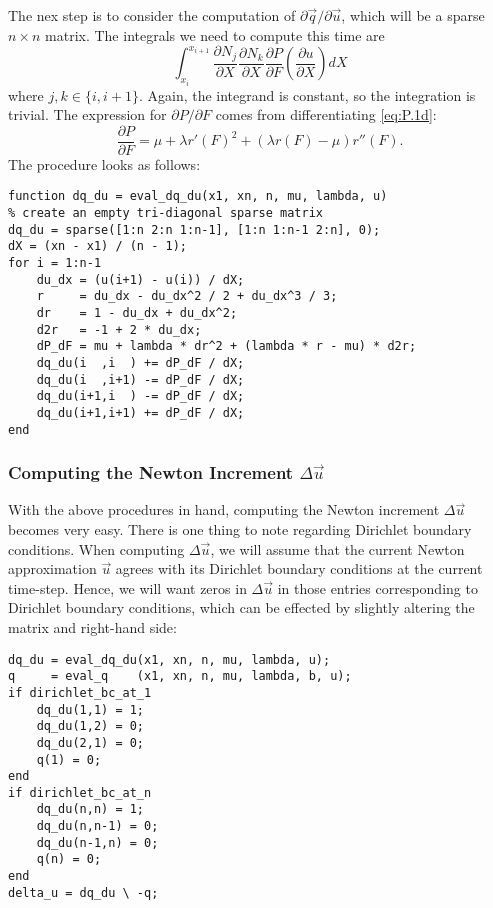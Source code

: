 The nex step is to consider the computation of $\partial\vec{q}/\partial\vec{u}$, which will be a sparse $n \times n$ matrix. The integrals we need to compute this time are
\begin{equation*}
\int_{x_i}^{x_{i+1}} \frac{\partial N_j}{\partial X} \frac{\partial N_k}{\partial X} \frac{\partial P}{\partial F} \left( \frac{\partial u}{\partial X} \right) dX
\end{equation*}
where $j,k \in \{i, i+1\}$. Again, the integrand is constant, so the integration is trivial. The expression for $\partial P/\partial F$ comes from differentiating \eqref{eq:P.1d}:
\begin{equation*}
\frac{\partial P}{\partial F} = \mu + \lambda r'(F)^2 + \left( \lambda r(F) - \mu \right) r''(F).
\end{equation*}
The procedure looks as follows:
\begin{verbatim}
function dq_du = eval_dq_du(x1, xn, n, mu, lambda, u)
% create an empty tri-diagonal sparse matrix
dq_du = sparse([1:n 2:n 1:n-1], [1:n 1:n-1 2:n], 0);
dX = (xn - x1) / (n - 1);
for i = 1:n-1
    du_dx = (u(i+1) - u(i)) / dX;
    r     = du_dx - du_dx^2 / 2 + du_dx^3 / 3;
    dr    = 1 - du_dx + du_dx^2;
    d2r   = -1 + 2 * du_dx;
    dP_dF = mu + lambda * dr^2 + (lambda * r - mu) * d2r;
    dq_du(i  ,i  ) += dP_dF / dX;
    dq_du(i  ,i+1) -= dP_dF / dX;
    dq_du(i+1,i  ) -= dP_dF / dX;
    dq_du(i+1,i+1) += dP_dF / dX;
end
\end{verbatim}

\subsubsection{Computing the Newton Increment $\Delta \vec{u}$}

With the above procedures in hand, computing the Newton increment $\Delta \vec{u}$ becomes very easy. There is one thing to note regarding Dirichlet boundary conditions. When computing $\Delta \vec{u}$, we will assume that the current Newton approximation $\vec{u}$ agrees with its Dirichlet boundary conditions at the current time-step. Hence, we will want zeros in $\Delta \vec{u}$ in those entries corresponding to Dirichlet boundary conditions, which can be effected by slightly altering the matrix and right-hand side:
\begin{verbatim}
dq_du = eval_dq_du(x1, xn, n, mu, lambda, u);
q     = eval_q    (x1, xn, n, mu, lambda, b, u);
if dirichlet_bc_at_1
    dq_du(1,1) = 1;
    dq_du(1,2) = 0;
    dq_du(2,1) = 0;
    q(1) = 0;
end
if dirichlet_bc_at_n
    dq_du(n,n) = 1;
    dq_du(n,n-1) = 0;
    dq_du(n-1,n) = 0;
    q(n) = 0;
end
delta_u = dq_du \ -q;
\end{verbatim}

